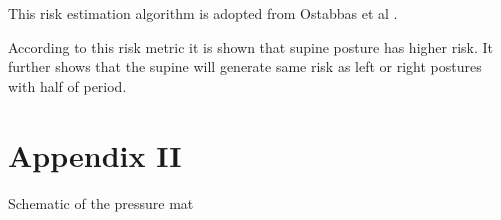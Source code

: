 This risk estimation algorithm is adopted from Ostabbas et al \cite{schedule}.

According to this risk metric it is shown that supine posture has higher risk. It further shows that the supine will generate same risk as left or right postures with half of period. 

\chapter*{Appendix II}
\label{chapter:appendix2}

Schematic of the pressure mat



% 




